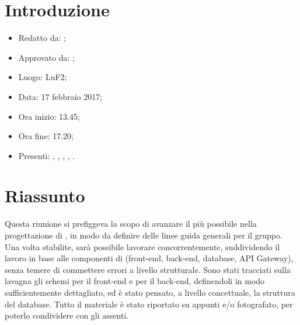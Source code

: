 \section{Introduzione}

	\begin{itemize}
		\item Redatto da: \MC;
		\item Approvato da: \DS;
		\item Luogo: LuF2;
		\item Data: 17 febbraio 2017;
		\item Ora inizio: 13.45;
		\item Ora fine: 17.20;
		\item Presenti: \AN, \DAN, \DS, \MC, \NS.	
	\end{itemize}

\section{Riassunto}
Questa riunione si prefiggeva la scopo di avanzare il più possibile nella progettazione di \progetto, in modo da definire delle linee guida generali per il gruppo. Una volta stabilite, sarà possibile lavorare concorrentemente, suddividendo il lavoro in base alle componenti di \progetto (front-end, back-end, database, API Gateway), senza temere di commettere errori a livello strutturale.
Sono stati tracciati sulla lavagna gli schemi per il front-end e per il back-end, definendoli in modo sufficientemente dettagliato, ed è stato pensato, a livello concettuale, la struttura del database.
Tutto il materiale è stato riportato su appunti e/o fotografato, per poterlo condividere con gli assenti.